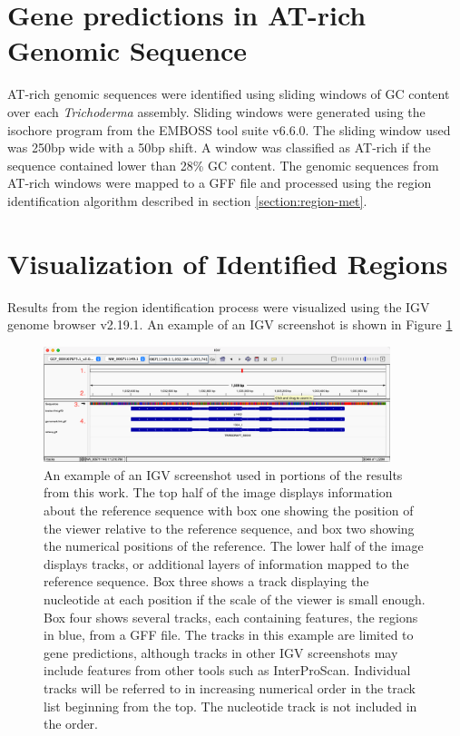 \section{Gene predictions in AT-rich Genomic Sequence}
\label{met:atrich}
AT-rich genomic sequences were identified using sliding windows of GC
content over each \textit{Trichoderma} assembly. Sliding windows were
generated using the isochore program from the EMBOSS tool suite
v6.6.0\cite{Rice2000}. The sliding window used was 250bp wide with a
50bp shift. A window was classified as AT-rich if the sequence
contained lower than 28\% GC content. The genomic sequences from
AT-rich windows were mapped to a GFF file and processed using the
region identification algorithm described in section
\ref{section:region-met}.

\section{Visualization of Identified Regions}
\label{section:igv-met}
Results from the region identification process were visualized using
the IGV genome browser v2.19.1\cite{Robinson2011}. An example of an
IGV screenshot is shown in Figure \ref{fig:igv-methods}

\begin{figure}
  \centering
  \includegraphics[width=0.9\textwidth]{figures/igv/igv-agreement-thin-number}
  \caption[IGV example]{An example of an IGV screenshot used in
    portions of the results from this work. The top half of the image
    displays information about the reference sequence with box one
    showing the position of the viewer relative to the reference
    sequence, and box two showing the numerical positions of the
    reference. The lower half of the image displays tracks, or
    additional layers of information mapped to the reference
    sequence. Box three shows a track displaying the nucleotide at
    each position if the scale of the viewer is small enough. Box four
    shows several tracks, each containing features, the regions in
    blue, from a GFF file. The tracks in this example are limited to
    gene predictions, although tracks in other IGV screenshots may
    include features from other tools such as InterProScan. Individual
    tracks will be referred to in increasing numerical order in the
    track list beginning from the top. The nucleotide track is not
    included in the order.}
  \label{fig:igv-methods}
\end{figure}

